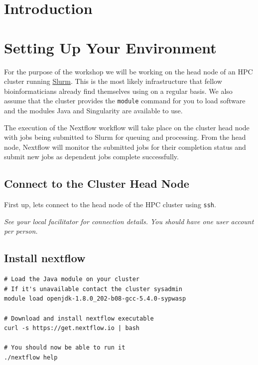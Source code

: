 \newpage

\section{Introduction}


\newpage

\section{Setting Up Your Environment}

For the purpose of the workshop we will be working on the head node of an HPC cluster running \href{https://slurm.schedmd.com/documentation.html}{Slurm}.
This is the most likely infrastructure that fellow bioinformaticians already find themselves using
on a regular basis. We also assume that the cluster provides the \texttt{module} command for you to
load software and the modules Java and Singularity are available to use.

The execution of the Nextflow workflow will take place on the cluster head node with jobs
being submitted to Slurm for queuing and processing. From the head node, Nextflow will monitor the
submitted jobs for their completion status and submit new jobs as dependent jobs complete successfully.


\subsection{Connect to the Cluster Head Node}

\begin{steps}
First up, lets connect to the head node of the HPC cluster using \texttt{ssh}.

\emph{See your local facilitator for connection details. You should have one user account per person.}

\end{steps}

\subsection{Install nextflow}


\begin{steps}
\begin{lstlisting}
# Load the Java module on your cluster
# If it's unavailable contact the cluster sysadmin
module load openjdk-1.8.0_202-b08-gcc-5.4.0-sypwasp 

# Download and install nextflow executable
curl -s https://get.nextflow.io | bash

# You should now be able to run it
./nextflow help
\end{lstlisting}
\end{steps}

